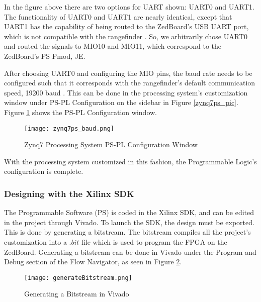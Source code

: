 In the figure above there are two options for UART shown: UART0 and UART1. The functionality of UART0 and UART1 are nearly identical, except that UART1 has the capability of being routed to the ZedBoard's USB UART port, which is not compatible with the rangefinder \cite{zedboard_datasheet}. So, we arbitrarily chose UART0 and routed the signals to MIO10 and MIO11, which correspond to the ZedBoard's PS Pmod, JE.
\par
After choosing UART0 and configuring the MIO pins, the baud rate needs to be configured such that it corresponds with the rangefinder's default communication speed, 19200 baud \cite{urg04lx_datasheet}. This can be done in the processing system's customization window under PS-PL Configuration on the sidebar in Figure \ref{zynq7ps_pic}. Figure \ref{zynq7ps_baud_pic} shows the PS-PL Configuration window.

\begin{figure}[H]
	\centerline{\texttt{[image: zynq7ps\_baud.png]}}
	\caption{Zynq7 Processing System PS-PL Configuration Window}
	\label{zynq7ps_baud_pic}
\end{figure}

With the processing system customized in this fashion, the Programmable Logic's configuration is complete.

\subsubsection{Designing with the Xilinx SDK}
The Programmable Software (PS) is coded in the Xilinx SDK, and can be edited in the project through Vivado. To launch the SDK, the design must be exported. This is done by generating a bitstream. The bitstream compiles all the project's customization into a $.bit$ file which is used to program the FPGA on the ZedBoard. Generating a bitstream can be done in Vivado under the Program and Debug section of the Flow Navigator, as seen in Figure \ref{generateBitstream}.

\begin{figure}[H]
	\centerline{\texttt{[image: generateBitstream.png]}}
	\caption{Generating a Bitstream in Vivado}
	\label{generateBitstream}
\end{figure}

